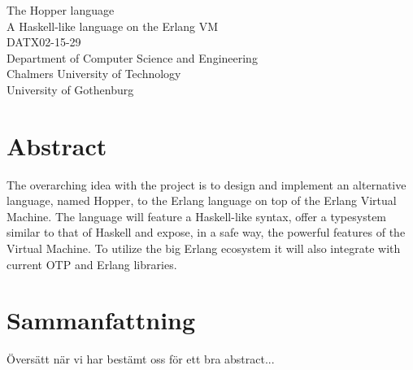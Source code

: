 The Hopper language\\
A Haskell-like language on the Erlang VM\\
DATX02-15-29\\
Department of Computer Science and Engineering\\
Chalmers University of Technology\\
University of Gothenburg\\

\thispagestyle{plain}			%
\section*{Abstract}
The overarching idea with the project is to design and implement an alternative
language, named Hopper, to the Erlang language on top of the Erlang Virtual
Machine. The language will feature a Haskell-like syntax, offer a typesystem
similar to that of Haskell and expose, in a safe way, the powerful features of
the Virtual Machine. To utilize the big Erlang ecosystem it will also integrate
with current OTP and Erlang libraries.

\section*{Sammanfattning}
Översätt när vi har bestämt oss för ett bra abstract...



\newpage				%
\thispagestyle{empty}
\mbox{}
